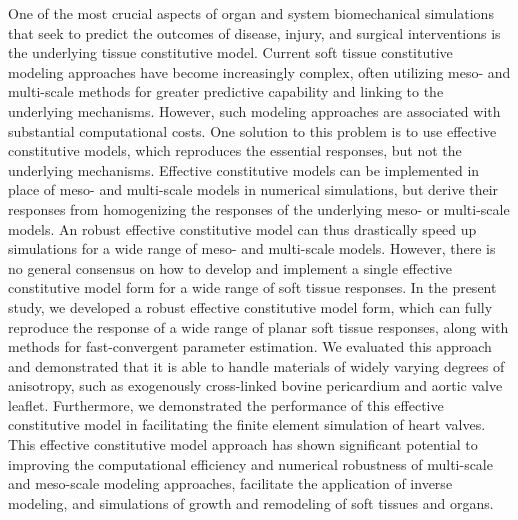 	One of the most crucial aspects of organ and system biomechanical simulations that seek to predict the outcomes of disease, injury, and surgical interventions is the underlying tissue constitutive model. Current soft tissue constitutive modeling approaches have become increasingly complex, often utilizing meso- and multi-scale methods for greater predictive capability and linking to the underlying mechanisms. However, such modeling approaches are associated with substantial computational costs. One solution to this problem is to use effective constitutive models, which reproduces the essential responses, but not the underlying mechanisms. Effective constitutive models can be implemented in place of meso- and multi-scale models in numerical simulations, but derive their responses from homogenizing the responses of the underlying meso- or multi-scale models. An robust effective constitutive model can thus drastically speed up simulations for a wide range of meso- and multi-scale models. However, there is no general consensus on how to develop and implement a single effective constitutive model form for a wide range of soft tissue responses. In the present study, we developed a robust effective constitutive model form, which can fully reproduce the response of a wide range of planar soft tissue responses, along with methods for fast-convergent parameter estimation. We evaluated this approach and demonstrated that it is able to handle materials of widely varying degrees of anisotropy, such as exogenously cross-linked bovine pericardium and aortic valve leaflet. Furthermore, we demonstrated the performance of this effective constitutive model in facilitating the finite element simulation of heart valves. This effective constitutive model approach has shown significant potential to improving the computational efficiency and numerical robustness of multi-scale and meso-scale modeling approaches, facilitate the application of inverse modeling, and simulations of growth and remodeling of soft tissues and organs.





